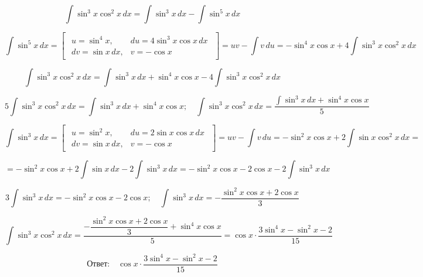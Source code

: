\documentclass[a4paper, fleqn]{article}
\begin{document}



\[
\int \sin^3 x \cos^2 x\, dx = \int \sin^3 x\, dx - \int \sin^5 x\, dx
\]

\[
\int \sin^5 x\, dx =
    \begin{bmatrix}
        \begin{array}{ll}
            u = \sin^4 x, & du = 4\sin^3 x \cos x \,dx \\
            dv = \sin x \,dx, & v = -\cos x
        \end{array}
    \end{bmatrix} =
    uv - \int v\, du =
    -\sin^4 x \cos x + 4 \int \sin^3 x \cos^2 x\, dx
\]

\[
\int \sin^3 x \cos^2 x\, dx = \int \sin^3 x\, dx + \sin^4 x \cos x - 4 \int \sin^3 x \cos^2 x\, dx
\]

\[
5 \int \sin^3 x \cos^2 x\, dx = \int \sin^3 x\, dx + \sin^4 x \cos x; \quad 
\int \sin^3 x \cos^2 x\, dx = \frac{\int \sin^3 x\, dx + \sin^4 x \cos x}{5}
\]

\[
\int \sin^3 x\, dx =
    \begin{bmatrix}
        \begin{array}{ll}
            u = \sin^2 x, & du = 2\sin x \cos x \,dx \\
            dv = \sin x \,dx, & v = -\cos x
        \end{array}
    \end{bmatrix} =
    uv - \int v\, du =
    -\sin^2 x \cos x + 2 \int \sin x \cos^2 x\, dx =
\]

\[
= -\sin^2 x \cos x + 2 \int \sin x\, dx - 2 \int \sin^3 x\, dx = 
  -\sin^2 x \cos x - 2 \cos x - 2 \int \sin^3 x\, dx
\]

\[
3 \int \sin^3 x\, dx = -\sin^2 x \cos x - 2 \cos x; \quad 
\int \sin^3 x\, dx = - \dfrac{\sin^2 x \cos x + 2 \cos x}{3} 
\]

\[
\int \sin^3 x \cos^2 x\, dx =
\dfrac{- \dfrac{\sin^2 x \cos x + 2 \cos x}{3} + \sin^4 x \cos x}{5} = 
\cos x \cdot \dfrac{3 \sin^4 x - \sin^2 x - 2}{15}
\]

\[
\textbf{Ответ:} \quad \cos x \cdot \dfrac{3 \sin^4 x - \sin^2 x - 2}{15}
\]
\end{document}
